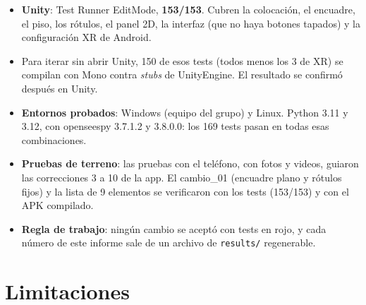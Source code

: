 \documentclass[11pt,a4paper]{article}
\begin{document}
\begin{itemize}
  \item \textbf{Unity}: Test Runner EditMode, \textbf{153/153}. Cubren la
        colocación, el encuadre, el piso, los rótulos, el panel 2D, la interfaz
        (que no haya botones tapados) y la configuración XR de Android.
  \item Para iterar sin abrir Unity, 150 de esos tests (todos menos los 3 de
        XR) se compilan con Mono contra \emph{stubs} de UnityEngine. El resultado
        se confirmó después en Unity.
  \item \textbf{Entornos probados}: Windows (equipo del grupo) y Linux.
        Python 3.11 y 3.12, con openseespy 3.7.1.2 y 3.8.0.0: los 169 tests
        pasan en todas esas combinaciones.
  \item \textbf{Pruebas de terreno}: las pruebas con el teléfono, con fotos y
        videos, guiaron las correcciones 3 a 10 de la app. El cambio\_01 (encuadre
        plano y rótulos fijos) y la lista de 9 elementos se verificaron con los
        tests (153/153) y con el APK compilado.
  \item \textbf{Regla de trabajo}: ningún cambio se aceptó con tests en rojo,
        y cada número de este informe sale de un archivo de \texttt{results/}
        regenerable.
\end{itemize}

\section{Limitaciones}\label{sec:limitaciones}
\end{document}
